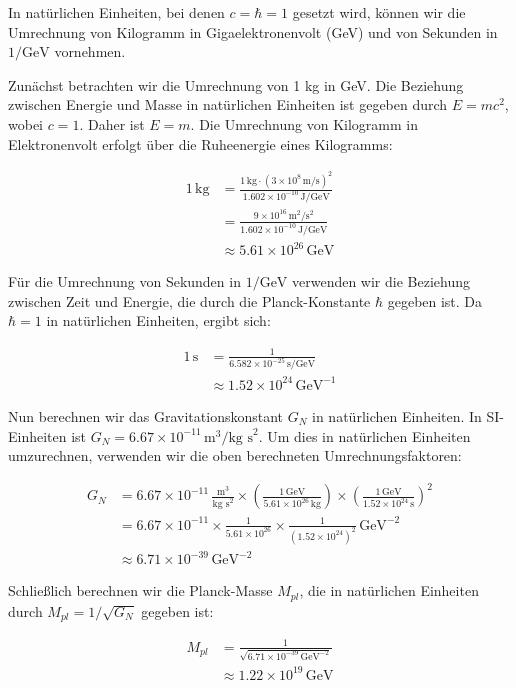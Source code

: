 In natürlichen Einheiten, bei denen $c = \hbar = 1$ gesetzt wird, können wir die Umrechnung von Kilogramm in Gigaelektronenvolt (GeV) und von Sekunden in $1/\mathrm{GeV}$ vornehmen. 

Zunächst betrachten wir die Umrechnung von 1 kg in GeV. Die Beziehung zwischen Energie und Masse in natürlichen Einheiten ist gegeben durch $E = mc^2$, wobei $c = 1$. Daher ist $E = m$. Die Umrechnung von Kilogramm in Elektronenvolt erfolgt über die Ruheenergie eines Kilogramms:

\begin{align*}
1 \, \text{kg} &= \frac{1 \, \text{kg} \cdot (3 \times 10^8 \, \text{m/s})^2}{1.602 \times 10^{-10} \, \text{J/GeV}} \\
&= \frac{9 \times 10^{16} \, \text{m}^2/\text{s}^2}{1.602 \times 10^{-10} \, \text{J/GeV}} \\
&\approx 5.61 \times 10^{26} \, \text{GeV}
\end{align*}

Für die Umrechnung von Sekunden in $1/\mathrm{GeV}$ verwenden wir die Beziehung zwischen Zeit und Energie, die durch die Planck-Konstante $\hbar$ gegeben ist. Da $\hbar = 1$ in natürlichen Einheiten, ergibt sich:

\begin{align*}
1 \, \text{s} &= \frac{1}{6.582 \times 10^{-25} \, \text{s/GeV}} \\
&\approx 1.52 \times 10^{24} \, \text{GeV}^{-1}
\end{align*}

Nun berechnen wir das Gravitationskonstant $G_N$ in natürlichen Einheiten. In SI-Einheiten ist $G_N = 6.67 \times 10^{-11} \, \text{m}^3/\text{kg s}^2$. Um dies in natürlichen Einheiten umzurechnen, verwenden wir die oben berechneten Umrechnungsfaktoren:

\begin{align*}
G_N &= 6.67 \times 10^{-11} \, \frac{\text{m}^3}{\text{kg s}^2} \times \left( \frac{1 \, \text{GeV}}{5.61 \times 10^{26} \, \text{kg}} \right) \times \left( \frac{1 \, \text{GeV}}{1.52 \times 10^{24} \, \text{s}} \right)^2 \\
&= 6.67 \times 10^{-11} \times \frac{1}{5.61 \times 10^{26}} \times \frac{1}{(1.52 \times 10^{24})^2} \, \text{GeV}^{-2} \\
&\approx 6.71 \times 10^{-39} \, \text{GeV}^{-2}
\end{align*}

Schließlich berechnen wir die Planck-Masse $M_{pl}$, die in natürlichen Einheiten durch $M_{pl} = 1/\sqrt{G_N}$ gegeben ist:

\begin{align*}
M_{pl} &= \frac{1}{\sqrt{6.71 \times 10^{-39} \, \text{GeV}^{-2}}} \\
&\approx 1.22 \times 10^{19} \, \text{GeV}
\end{align*}

